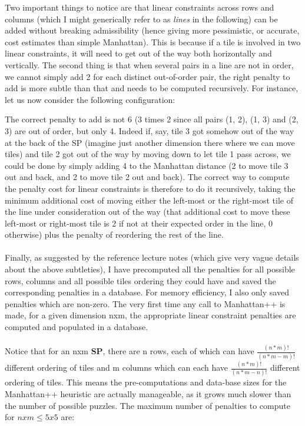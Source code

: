 \begin{itemize}
Two important things to notice are that linear constraints across rows and columns (which I might generically refer to as \textit{lines} in the following) can be added without breaking admissibility (hence giving more pessimistic, or accurate, cost estimates than simple Manhattan). This is because if a tile is involved in two linear constraints, it will need to get out of the way both horizontally and vertically. The second thing is that when several pairs in a line are not in order, we cannot simply add 2 for each distinct out-of-order pair, the right penalty to add is more subtle than that and needs to be computed recursively. For instance, let us now consider the following configuration:
\begin{center}
\begin{five}
\end{five}
\end{center}
The correct penalty to add is not 6 (3 times 2 since all pairs (1, 2), (1, 3) and (2, 3) are out of order, but only 4. Indeed if, say, tile 3 got somehow out of the way at the back of the SP (imagine just another dimension there where we can move tiles) and tile 2 got out of the way by moving down to let tile 1 pass across, we could be done by simply adding 4 to the Manhattan distance (2 to move tile 3 out and back, and 2 to move tile 2 out and back). The correct way to compute the penalty cost for linear constraints is therefore to do it recursively, taking the minimum additional cost of moving either the left-most or the right-most tile of the line under consideration out of the way (that additional cost to move these left-most or right-most tile is 2 if not at their expected order in the line, 0 otherwise) plus the penalty of reordering the rest of the line.
\\
\\
Finally, as suggested by the reference lecture notes (which give very vague details about the above subtleties), I have precomputed all the penalties for all possible rows, columns and all possible tiles ordering they could have and saved the corresponding penalties in a database. For memory efficiency, I also only saved penalties which are non-zero. The very first time any call to Manhattan++ is made, for a given dimension nxm, the appropriate linear constraint penalties are computed and populated in a database.
\\
\\
Notice that for an nxm \textbf{SP}, there are n rows, each of which can have $\frac{(n * m)!}{(n * m - m)!}$ different ordering of tiles and m columns which can each have $\frac{(n * m)!}{(n * m - n)!}$ different ordering of tiles. This means the pre-computations and data-base sizes for the Manhattan++ heuristic are actually manageable, as it grows much slower than the number of possible puzzles. The maximum number of penalties to compute for $nxm \leq 5x5$ are:



\end{itemize}
